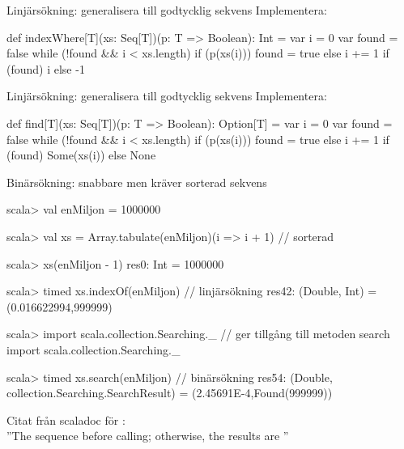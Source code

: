 \begin{Slide}{Linjärsökning: generalisera till godtycklig sekvens}\SlideFontSmall
Implementera:\\ 
\pause
\begin{Code}
def indexWhere[T](xs: Seq[T])(p: T => Boolean): Int = {
  var i = 0
  var found = false
  while (!found && i < xs.length) {
    if (p(xs(i))) found = true 
    else i += 1
  }
  if (found) i else -1
} 
\end{Code}
\end{Slide}

\begin{Slide}{Linjärsökning: generalisera till godtycklig sekvens}\SlideFontSmall
Implementera:\\ 
\pause
\begin{Code}
def find[T](xs: Seq[T])(p: T => Boolean): Option[T] = {
  var i = 0
  var found = false
  while (!found && i < xs.length) {
    if (p(xs(i))) found = true 
    else i += 1
  }
  if (found) Some(xs(i)) else None
} 
\end{Code}
\end{Slide}


\begin{Slide}{Binärsökning: snabbare men kräver sorterad sekvens}
\begin{REPL}[basicstyle=\color{white}\ttfamily\SlideFontSize{6.5}{8}]
scala> val enMiljon = 1000000

scala> val xs = Array.tabulate(enMiljon)(i => i + 1)   // sorterad

scala> xs(enMiljon - 1)
res0: Int = 1000000

scala> timed { xs.indexOf(enMiljon) }        // linjärsökning
res42: (Double, Int) = (0.016622994,999999)

scala> import scala.collection.Searching._  // ger tillgång till metoden search
import scala.collection.Searching._

scala> timed { xs.search(enMiljon) }        // binärsökning
res54: (Double, collection.Searching.SearchResult) = (2.45691E-4,Found(999999))

\end{REPL}
\pause
Citat från scaladoc för :\\
''The sequence  before calling; otherwise, the results are ''
\end{Slide}

